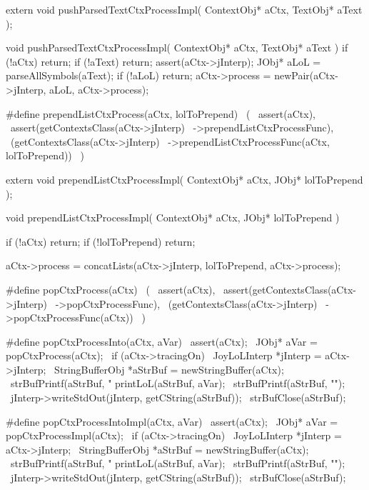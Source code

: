 \startCHeader
extern void pushParsedTextCtxProcessImpl(
  ContextObj* aCtx,
  TextObj* aText
);
\stopCHeader
{}

\startCCode
void pushParsedTextCtxProcessImpl(
  ContextObj* aCtx,
  TextObj* aText
) {
  if (!aCtx) return;
  if (!aText) return;
  assert(aCtx->jInterp);
  JObj* aLoL = parseAllSymbols(aText);
  if (!aLoL) return;
  aCtx->process = newPair(aCtx->jInterp, aLoL, aCtx->process);
}
\stopCCode

\startCHeader
#define prependListCtxProcess(aCtx, lolToPrepend)      \
  (                                                    \
    assert(aCtx),                                      \
    assert(getContextsClass(aCtx->jInterp)             \
      ->prependListCtxProcessFunc),                    \
    (getContextsClass(aCtx->jInterp)                   \
      ->prependListCtxProcessFunc(aCtx, lolToPrepend)) \
  )
\stopCHeader

\setCHeaderStream{private}
\startCHeader
extern void prependListCtxProcessImpl(
  ContextObj* aCtx,
  JObj* lolToPrepend
);
\stopCHeader
\setCHeaderStream{public}

\startCCode
void prependListCtxProcessImpl(
  ContextObj* aCtx,
  JObj* lolToPrepend
) {
  if (!aCtx) return;
  if (!lolToPrepend) return;

  aCtx->process =
    concatLists(aCtx->jInterp, lolToPrepend, aCtx->process);
}
\stopCCode

\startCHeader
#define popCtxProcess(aCtx)                    \
  (                                            \
    assert(aCtx),                              \
    assert(getContextsClass(aCtx->jInterp)     \
      ->popCtxProcessFunc),                    \
    (getContextsClass(aCtx->jInterp)           \
      ->popCtxProcessFunc(aCtx))               \
  )

#define popCtxProcessInto(aCtx, aVar)                  \
assert(aCtx);                                          \
JObj* aVar = popCtxProcess(aCtx);                      \
if (aCtx->tracingOn) {                                 \
  JoyLoLInterp *jInterp = aCtx->jInterp;               \
  StringBufferObj *aStrBuf = newStringBuffer(aCtx);    \
  strBufPrintf(aStrBuf, "%
  printLoL(aStrBuf, aVar);                             \
  strBufPrintf(aStrBuf, "\n");                         \
  jInterp->writeStdOut(jInterp, getCString(aStrBuf));  \
  strBufClose(aStrBuf);                                \
}

#define popCtxProcessIntoImpl(aCtx, aVar)              \
assert(aCtx);                                          \
JObj* aVar = popCtxProcessImpl(aCtx);                  \
if (aCtx->tracingOn) {                                 \
  JoyLoLInterp *jInterp = aCtx->jInterp;               \
  StringBufferObj *aStrBuf = newStringBuffer(aCtx);    \
  strBufPrintf(aStrBuf, "%
  printLoL(aStrBuf, aVar);                             \
  strBufPrintf(aStrBuf, "\n");                         \
  jInterp->writeStdOut(jInterp, getCString(aStrBuf));  \
  strBufClose(aStrBuf);                                \
}
\stopCHeader

